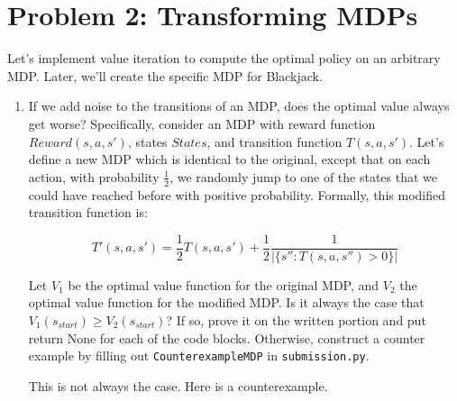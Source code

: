 \documentclass[10pt]{article}
\begin{document}
\section*{\normalsize Problem 2: Transforming MDPs}

Let's implement value iteration to compute the optimal policy on an arbitrary MDP. Later, we'll create the specific MDP for Blackjack. 
\smallskip

\begin{enumerate}[label=(\alph*)]

  \item If we add noise to the transitions of an MDP, does the optimal value always get worse? Specifically, consider an MDP with reward function $Reward(s,a,s')$, states $States$, and transition function $T(s,a,s′)$. Let's define a new MDP which is identical to the original, except that on each action, with probability $\frac{1}{2}$, we randomly jump to one of the states that we could have reached before with positive probability. Formally, this modified transition function is:
  
  $$T'(s,a,s') = \frac{1}{2} T(s,a,s') + \frac{1}{2} \frac{1}{| \{ s'':T(s,a,s'')>0 \} |}$$
  
  Let $V_1$ be the optimal value function for the original MDP, and $V_2$ the optimal value function for the modified MDP. Is it always the case that $V_1(s_{start}) \geq V_2(s_{start})$? If so, prove it on the written portion and put return None for each of the code blocks. Otherwise, construct a counter example by filling out \texttt{CounterexampleMDP} in \texttt{submission.py}.
  
  This is not always the case. Here is a counterexample.
  
  \begin{center}
	\end{center}
	

\end{enumerate}
\end{document}
